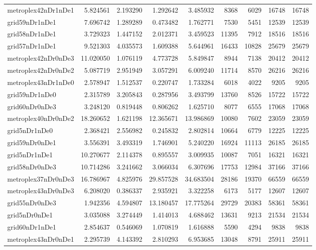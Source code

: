 \begin{longtable}{|l|r|r|r|r|r|r|r|r|}
metroplex42nDr1nDe1 & 5.824561 & 2.193290 & 1.292642 & 3.485932 & 8368 & 6029 & 16748 & 16748 \\
grid59nDr1nDe1 & 7.696742 & 1.289289 & 0.473482 & 1.762771 & 7530 & 5451 & 12539 & 12539 \\
grid58nDr1nDe1 & 3.729323 & 1.447152 & 2.012371 & 3.459523 & 11395 & 7912 & 18516 & 18516 \\
grid57nDr1nDe1 & 9.521303 & 4.035573 & 1.609388 & 5.644961 & 16433 & 10828 & 25679 & 25679 \\
metroplex42nDr0nDe3 & 11.020050 & 1.076119 & 4.773728 & 5.849847 & 8944 & 7138 & 20412 & 20412 \\
metroplex42nDr0nDe2 & 5.087719 & 2.951949 & 3.057291 & 6.009240 & 11714 & 8570 & 26216 & 26216 \\
metroplex43nDr1nDe0 & 2.578947 & 1.512537 & 0.220747 & 1.733284 & 6018 & 4022 & 9205 & 9205 \\
grid59nDr1nDe0 & 2.315789 & 3.205843 & 0.287956 & 3.493799 & 13760 & 8526 & 15722 & 15722 \\
grid60nDr0nDe3 & 3.248120 & 0.819448 & 0.806262 & 1.625710 & 8077 & 6555 & 17068 & 17068 \\
metroplex40nDr0nDe2 & 18.260652 & 1.621198 & 12.365671 & 13.986869 & 10080 & 7602 & 23059 & 23059 \\
grid5nDr1nDe0 & 2.368421 & 2.556982 & 0.245832 & 2.802814 & 10664 & 6779 & 12225 & 12225 \\
grid59nDr0nDe1 & 3.556391 & 3.493319 & 1.746901 & 5.240220 & 16924 & 11113 & 26185 & 26185 \\
grid5nDr1nDe1 & 10.270677 & 2.114378 & 0.895557 & 3.009935 & 10087 & 7051 & 16321 & 16321 \\
grid58nDr0nDe3 & 10.714286 & 3.241662 & 3.066034 & 6.307696 & 17753 & 12984 & 37166 & 37166 \\
metroplex37nDr0nDe3 & 16.786967 & 4.825976 & 29.857528 & 34.683504 & 28186 & 19370 & 66559 & 66559 \\
metroplex43nDr0nDe3 & 6.208020 & 0.386337 & 2.935921 & 3.322258 & 6173 & 5177 & 12607 & 12607 \\
grid55nDr0nDe3 & 1.942356 & 4.594807 & 13.180457 & 17.775264 & 29729 & 20383 & 58361 & 58361 \\
grid5nDr0nDe1 & 3.035088 & 3.274449 & 1.414013 & 4.688462 & 13631 & 9213 & 21534 & 21534 \\
grid60nDr1nDe1 & 2.854637 & 0.546069 & 1.070819 & 1.616888 & 5590 & 4294 & 9838 & 9838 \\
metroplex43nDr0nDe1 & 2.295739 & 4.143392 & 2.810293 & 6.953685 & 13048 & 8791 & 25911 & 25911 \\

\end{longtable}
